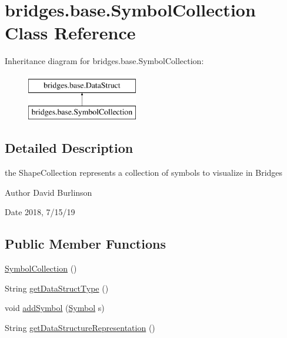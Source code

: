 \hypertarget{classbridges_1_1base_1_1_symbol_collection}{}\section{bridges.\+base.\+Symbol\+Collection Class Reference}
\label{classbridges_1_1base_1_1_symbol_collection}
Inheritance diagram for bridges.\+base.\+Symbol\+Collection\+:\begin{figure}[H]
\begin{center}
\leavevmode
\includegraphics[height=2.000000cm]{classbridges_1_1base_1_1_symbol_collection}
\end{center}
\end{figure}


\subsection{Detailed Description}
the Shape\+Collection represents a collection of symbols to visualize in Bridges 

\begin{DoxyAuthor}{Author}
David Burlinson 
\end{DoxyAuthor}
\begin{DoxyDate}{Date}
2018, 7/15/19 
\end{DoxyDate}
\subsection*{Public Member Functions}
\begin{DoxyCompactItemize}
\item 
\hyperlink{classbridges_1_1base_1_1_symbol_collection_a8959dab963ce54f56560c6c27a3a3de5}{Symbol\+Collection} ()
\item 
String \hyperlink{classbridges_1_1base_1_1_symbol_collection_afbc928d2e6818edec96d10f52feebacb}{get\+Data\+Struct\+Type} ()
\item 
void \hyperlink{classbridges_1_1base_1_1_symbol_collection_a8e934c53b78b05a7e982f3ff2362adea}{add\+Symbol} (\hyperlink{classbridges_1_1base_1_1_symbol}{Symbol} s)
\item 
String \hyperlink{classbridges_1_1base_1_1_symbol_collection_a706ad8a7bcf12c194403ac3281c73674}{get\+Data\+Structure\+Representation} ()
\end{DoxyCompactItemize}
